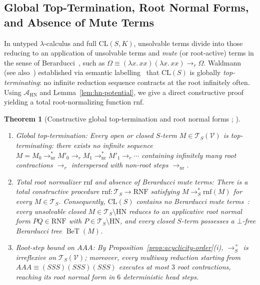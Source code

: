 \documentclass[11pt,reqno]{amsart}
\numberwithin{equation}{section}
\theoremstyle{plain}
\newtheorem{theorem}{Theorem}[section]
\theoremstyle{definition}
\theoremstyle{remark}
\DeclareMathOperator{\BeT}{BeT}
\newcommand{\CLS}{\mathrm{CL}(S)}
\newcommand{\TS}{\mathcal{T}_S}
\newcommand{\TSV}{\mathcal{T}_S(\mathcal{V})}
\newcommand{\RNF}{\mathrm{RNF}}
\newcommand{\HN}{\mathrm{HN}}
\newcommand{\redSp}{\to_S^+}
\newcommand{\redSs}{\to_S^*}
\begin{document}
\subsection{Global Top-Termination, Root Normal Forms, and Absence of Mute Terms}\label{subsec:top-termination}

In untyped $\lambda$-calculus and full $\mathrm{CL}(S, K)$, unsolvable terms divide into those reducing to an application of unsolvable terms and \emph{mute} (or root-active) terms in the sense of Berarducci~\cite{BerarducciBohm1993,Berarducci1996}, such as $\Omega \equiv (\lambda x.\,x x)(\lambda x.\,x x) \to_r \Omega$. Waldmann~\cite{Waldmann2000} (see also~\cite[Theorem~29]{BarendregtEndrullisKlopWaldmann2017}) established via semantic labelling~\cite{Zantema1995} that $\CLS$ is globally \emph{top-terminating}: no infinite reduction sequence contracts at the root infinitely often. Using $\mathcal{A}_{\HN}$ and Lemma~\ref{lem:hn-potential}, we give a direct constructive proof yielding a total root-normalizing function $\mathrm{rnf}$.

\begin{theorem}[Constructive global top-termination and root normal forms {\cite{Waldmann2000}; \cite[Theorem~29]{BarendregtEndrullisKlopWaldmann2017}}]\label{thm:waldmann-top-term}
\begin{enumerate}[label=(\roman*),leftmargin=2.2em]
  \item \emph{Global top-termination:} Every open or closed $S$-term $M \in \TSV$ is top-terminating: there exists no infinite sequence $M = M_0 \to_{\mathrm{nr}}^* M'_0 \to_r M_1 \to_{\mathrm{nr}}^* M'_1 \to_r \cdots$ containing infinitely many root contractions $\to_r$ interspersed with non-root steps $\to_{\mathrm{nr}}$.
  \item \emph{Total root normalizer $\mathrm{rnf}$ and absence of Berarducci mute terms:} There is a total constructive procedure $\mathrm{rnf} \colon \TS \to \RNF$ satisfying $M \redSs \mathrm{rnf}(M)$ for every $M \in \TS$. Consequently, $\CLS$ contains no Berarducci mute terms~\cite{Berarducci1996}: every unsolvable closed $M \in \TS \setminus \HN$ reduces to an applicative root normal form $P Q \in \RNF$ with $P \in \TS \setminus \HN$, and every closed $S$-term possesses a $\bot$-free Berarducci tree $\BeT(M)$.
  \item \emph{Root-step bound on $A A A$:} By Proposition~\ref{prop:acyclicity-order}(i), $\redSp$ is irreflexive on $\TSV$; moreover, every multiway reduction starting from $A A A \equiv (S S S)(S S S)(S S S)$ executes at most $3$ root contractions, reaching its root normal form in $6$ deterministic head steps.
\end{enumerate}
\end{theorem}
\end{document}
